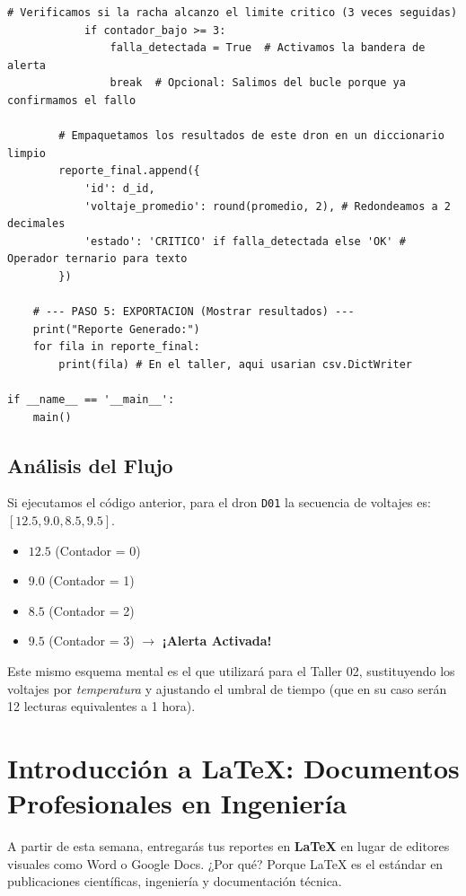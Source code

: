 \documentclass[11pt, a4paper]{article}
\begin{document}
\begin{lstlisting}[caption={Integración de conceptos: Análisis de Baterías (Detallado)}, label={lst:baterias}]
            # Verificamos si la racha alcanzo el limite critico (3 veces seguidas)
            if contador_bajo >= 3:
                falla_detectada = True  # Activamos la bandera de alerta
                break  # Opcional: Salimos del bucle porque ya confirmamos el fallo

        # Empaquetamos los resultados de este dron en un diccionario limpio
        reporte_final.append({
            'id': d_id,
            'voltaje_promedio': round(promedio, 2), # Redondeamos a 2 decimales
            'estado': 'CRITICO' if falla_detectada else 'OK' # Operador ternario para texto
        })

    # --- PASO 5: EXPORTACION (Mostrar resultados) ---
    print("Reporte Generado:")
    for fila in reporte_final:
        print(fila) # En el taller, aqui usarian csv.DictWriter

if __name__ == '__main__':
    main()
\end{lstlisting}

\subsection{Análisis del Flujo}
Si ejecutamos el código anterior, para el dron \texttt{D01} la secuencia de voltajes es: $[12.5, 9.0, 8.5, 9.5]$.
\begin{itemize}
    \item $12.5$ (Contador = 0)
    \item $9.0$ (Contador = 1)
    \item $8.5$ (Contador = 2)
    \item $9.5$ (Contador = 3) $\rightarrow$ \textbf{¡Alerta Activada!}
\end{itemize}

Este mismo esquema mental es el que utilizará para el Taller 02, sustituyendo los voltajes por \textit{temperatura} y ajustando el umbral de tiempo (que en su caso serán 12 lecturas equivalentes a 1 hora).

\newpage

\section{Introducción a LaTeX: Documentos Profesionales en Ingeniería}

A partir de esta semana, entregarás tus reportes en \textbf{LaTeX} en lugar de editores visuales como Word o Google Docs. ¿Por qué? Porque LaTeX es el estándar en publicaciones científicas, ingeniería y documentación técnica.
\end{document}

